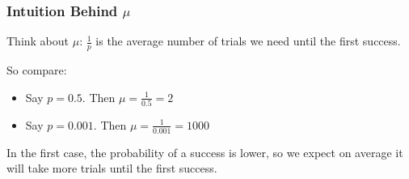 \documentclass[handout]{beamer}
\newcommand{\blue}[1]{\textcolor{blue2}{#1}}
\begin{document}
\begin{frame}[fragile]
\frametitle{Intuition Behind $\mu$}

Think about $\mu$:  $\frac{1}{p}$ is the average number of trials we need until the \blue{first} success.

\vspace{0.5cm}

\pause So compare:
\begin{itemize}
\item Say $p=0.5$.  Then $\mu = \frac{1}{0.5} = 2$
\item Say $p=0.001$.  Then $\mu = \frac{1}{0.001} = 1000$
\end{itemize}

\vspace{0.5cm}

\pause In the first case, the probability of a success is \blue{lower}, so we expect on average it will take more trials until the \blue{first} success.  

\end{frame}
\end{document}
